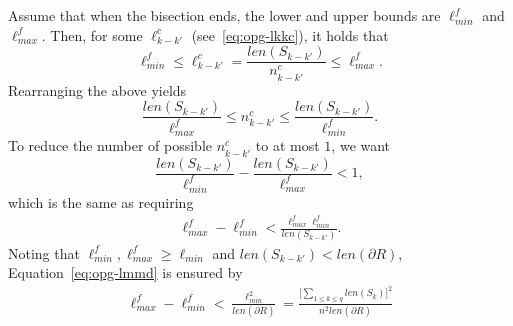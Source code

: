 Assume that when the bisection ends, the lower and upper bounds are 
$\ell_{min}^f$ and $\ell_{max}^f$. Then, for some $\ell_{k-k'}^c$
(see~\eqref{eq:opg-lkkc}), it holds that
\[
\ell_{min}^f \le \ell_{k-k'}^c = \frac{len(S_{k-k'})}{n_{k-k'}^c} \le \ell_{max}^f.
\]
Rearranging the above yields
\[
\frac{len(S_{k-k'})}{\ell_{max}^f} \le n_{k-k'}^c \le \frac{len(S_{k-k'})}{\ell_{min}^f}.
\]
To reduce the number of possible $n_{k-k'}^c$ to at most $1$, we want 
\[
\frac{len(S_{k-k'})}{\ell_{min}^f} - \frac{len(S_{k-k'})}{\ell_{max}^f} < 1, 
\]
which is the same as requiring 
\begin{align}\label{eq:opg-lmmd}
\ell_{max}^f- \ell_{min}^f <
\frac{\ell_{max}^f\ell_{min}^f}{len(S_{k-k'})}. 
\end{align}
Noting that $\ell_{min}^f, \ell_{max}^f \ge  \ell_{min}$ and $len(S_{k-k'}) < 
len (\partial R)$, Equation~\eqref{eq:opg-lmmd} is ensured by 
\begin{align}\label{eq:opg-lmmd2}
\ell_{max}^f- \ell_{min}^f 
< \frac{\ell_{min}^2}{len(\partial R)} 
= \frac{\Big[\sum_{1\le k\le q}len(S_k)\Big]^2}{n^2len(\partial R)} 
\end{align}


